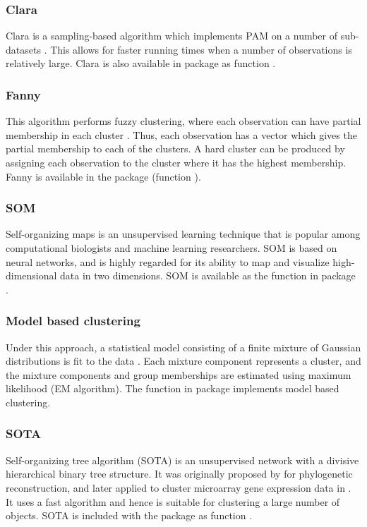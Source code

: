 \documentclass[11pt]{article}
\begin{document}
\subsubsection*{Clara}
Clara is a sampling-based algorithm which implements PAM
on a number of sub-datasets \citep{Kau1990}. This allows for faster
running times when a number of observations is relatively large.
Clara is also available in package  as function .


\subsubsection*{Fanny}
This algorithm performs fuzzy clustering, where each observation can
have partial membership in each cluster \citep{Kau1990}. Thus, each
observation has a vector which gives the partial membership to each of
the clusters.  
A hard cluster can be produced by assigning each observation to the
cluster where it has the highest membership.  Fanny is available in
the  package (function ).


\subsubsection*{SOM}
Self-organizing maps \citep{Koh1997} is an unsupervised learning
technique that is popular among computational biologists and
machine learning researchers.  SOM is based on neural
networks,
and is highly regarded for its ability to
map and visualize high-dimensional data in two dimensions.
SOM is available as the  function in package .


\subsubsection*{Model based clustering}
Under this approach, a statistical model consisting of
a finite mixture of Gaussian distributions is fit to the
data  \citep{Fra2001}. 
Each mixture component represents a cluster, and the mixture
components and group memberships are estimated using 
maximum likelihood (EM algorithm).
The function  in package  implements model
based clustering.


\subsubsection*{SOTA}
Self-organizing tree algorithm (SOTA) is an unsupervised
network with a divisive hierarchical binary tree structure. 
It was originally proposed by \citet{Dop1997} for phylogenetic
reconstruction, and later applied to cluster microarray gene
expression data in \citep{Her2001}. 
It uses a fast algorithm and hence is suitable
for clustering a large number of objects.
SOTA is included with the  package as function .
\end{document}
